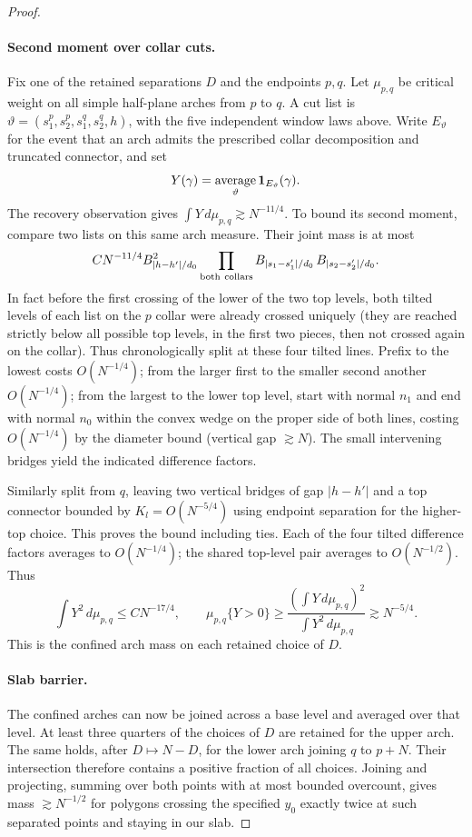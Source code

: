 \begin{proof}
\paragraph{Second moment over collar cuts.}
Fix one of the retained separations \(D\) and the endpoints \(p,q\). Let \(\mu_{p,q}\) be critical weight on all simple half-plane arches from \(p\) to \(q\). A cut list is
\(\vartheta=(s_1^p,s_2^p,s_1^q,s_2^q,h)\), with the five independent window laws above. Write \(E_\vartheta\) for the event that an arch admits the prescribed collar decomposition and truncated connector, and set
\[
 Y(\gamma)=\mathop{\mathrm{average}}_\vartheta
            {\bf1}_{E_\vartheta}(\gamma).
\]
The recovery observation gives \(\int Y\,d\mu_{p,q}\gtrsim N^{-11/4}\). To bound its second moment, compare two lists on this same arch measure. Their joint mass is at most
\[
 C N^{-11/4} B_{|h-h'|/d_0}^2
 \prod_{\rm both\ collars} B_{|s_1-s'_1|/d_0}\, B_{|s_2-s'_2|/d_0}.
\]
In fact before the first crossing of the lower of the two top levels, both tilted levels of each list on the \(p\) collar were already crossed uniquely (they are reached strictly below all possible top levels, in the first two pieces, then not crossed again on the collar). Thus chronologically split at these four tilted lines. Prefix to the lowest costs \(O(N^{-1/4})\); from the larger first to the smaller second another \(O(N^{-1/4})\); from the largest to the lower top level, start with normal \(n_1\) and end with normal \(n_0\) within the convex wedge on the proper side of both lines, costing \(O(N^{-1/4})\) by the diameter bound (vertical gap \(\gtrsim N\)). The small intervening bridges yield the indicated difference factors.

Similarly split from \(q\), leaving two vertical bridges of gap \(|h-h'|\) and a top connector bounded by \(K_l=O(N^{-5/4})\) using endpoint separation for the higher-top choice. This proves the bound including ties. Each of the four tilted difference factors averages to \(O(N^{-1/4})\); the shared top-level pair averages to \(O(N^{-1/2})\). Thus
\[
 \int Y^2\,d\mu_{p,q}\le C N^{-17/4},
 \qquad
 \mu_{p,q}\{Y>0\}\ge
 \frac{(\int Y\,d\mu_{p,q})^2}{\int Y^2\,d\mu_{p,q}}
 \gtrsim N^{-5/4}.
\]
This is the confined arch mass on each retained choice of \(D\).

\paragraph{Slab barrier.}
The confined arches can now be joined across a base level and averaged over that level. At least three quarters of the choices of \(D\) are retained for the upper arch. The same holds, after \(D\mapsto N-D\), for the lower arch joining \(q\) to \(p+N\). Their intersection therefore contains a positive fraction of all choices. Joining and projecting, summing over both points with at most bounded overcount, gives mass \(\gtrsim N^{-1/2}\) for polygons crossing the specified \(y_0\) exactly twice at such separated points and staying in our slab.


\end{proof}
